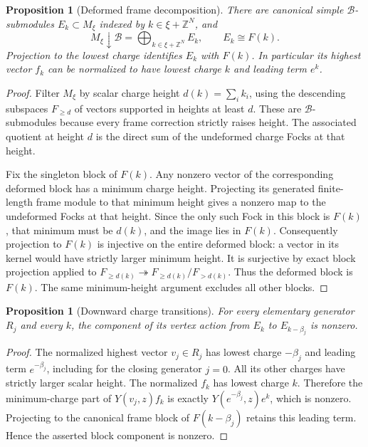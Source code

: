 \documentclass[11pt,a4paper]{article}
\numberwithin{equation}{section}
\newtheorem{proposition}[theorem]{Proposition}
\theoremstyle{definition}\newtheorem{definition}[theorem]{Definition}
\theoremstyle{remark}\newtheorem{remark}[theorem]{Remark}
\begin{document}
\begin{proposition}[Deformed frame decomposition]
\label{g:prop:periodic-frame}
There are canonical simple $\mathcal B$-submodules $E_k\subset M_\xi$
indexed by $k\in\xi+\mathbb Z^N$, and
\[
M_\xi\downarrow\mathcal B=\bigoplus_{k\in\xi+\mathbb Z^N}E_k,
\qquad E_k\cong F(k).
\]
Projection to the lowest charge identifies $E_k$ with $F(k)$. In
particular its highest vector $f_k$ can be normalized to have lowest
charge $k$ and leading term $e^k$.
\end{proposition}
\begin{proof}
Filter $M_\xi$ by scalar charge height
$d(k)=\sum_i k_i$, using the descending subspaces
$F_{\ge d}$ of vectors supported in heights at least $d$. These are
$\mathcal B$-submodules because every frame correction strictly raises
height. The associated quotient at height $d$ is the direct sum of the
undeformed charge Focks at that height.

Fix the singleton block of $F(k)$. Any nonzero vector of the corresponding
deformed block has a minimum charge height. Projecting its generated
finite-length frame module to that minimum height gives a nonzero map
to the undeformed Focks at that height. Since the only such Fock in this
block is $F(k)$, that minimum must be $d(k)$, and the image lies in $F(k)$.
Consequently projection to $F(k)$ is injective on the entire deformed
block: a vector in its kernel would have strictly larger minimum height.
It is surjective by exact block projection applied to
$F_{\ge d(k)}\twoheadrightarrow F_{\ge d(k)}/F_{>d(k)}$.
Thus the deformed block is $F(k)$. The same minimum-height argument
excludes all other blocks.
\end{proof}

\begin{proposition}[Downward charge transitions]
\label{g:prop:downward-links}
For every elementary generator $R_j$ and every $k$, the component of its
vertex action from $E_k$ to $E_{k-\beta_j}$ is nonzero.
\end{proposition}
\begin{proof}
The normalized highest vector $v_j\in R_j$ has lowest charge $-\beta_j$
and leading term $e^{-\beta_j}$, including for the closing generator
$j=0$. All its other charges have strictly larger scalar height.
The normalized $f_k$ has lowest charge $k$. Therefore the minimum-charge
part of $Y(v_j,z)f_k$ is exactly
$Y(e^{-\beta_j},z)e^k$, which is nonzero. Projecting to the canonical
frame block of $F(k-\beta_j)$ retains this leading term. Hence the
asserted block component is nonzero.
\end{proof}
\end{document}
